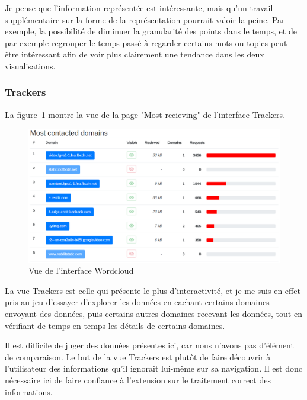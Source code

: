 		Je pense que l'information représentée est intéressante, mais qu'un travail supplémentaire sur la forme de la représentation pourrait valoir la peine. Par exemple, la possibilité de diminuer la granularité des points dans le temps, et de par exemple regrouper le temps passé à regarder certains mots ou topics peut être intéressant afin de voir plus clairement une tendance dans les deux visualisations.

\FloatBarrier

		\subsubsection{Trackers}

		La figure~\ref{critique-trackers} montre la vue de la page "Most recieving" de l'interface Trackers.

		\begin{figure}[!h]
			\centering
			\includegraphics[width=1\textwidth]{images/results/critique-trackers}
			\caption{Vue de l'interface Wordcloud}
			\label{critique-trackers}
		\end{figure}

		La vue Trackers est celle qui présente le plus d'interactivité, et je me suis en effet pris au jeu d'essayer d'explorer les données en cachant certains domaines envoyant des données, puis certains autres domaines recevant les données, tout en vérifiant de temps en temps les détails de certains domaines.

		Il est difficile de juger des données présentes ici, car nous n'avons pas d'élément de comparaison. Le but de la vue Trackers est plutôt de faire découvrir  à l'utilisateur des informations qu'il ignorait lui-même sur sa navigation. Il est donc nécessaire ici de faire confiance à l'extension sur le traitement correct des informations.

